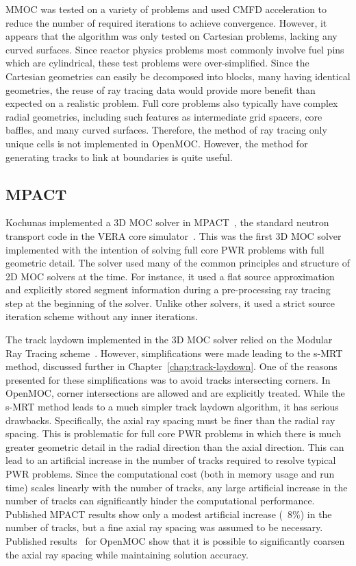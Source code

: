 MMOC was tested on a variety of problems and used \ac{CMFD} acceleration to reduce the number of required iterations to achieve convergence.  However, it appears that the algorithm was only tested on Cartesian problems, lacking any curved surfaces. Since reactor physics problems most commonly involve fuel pins which are cylindrical, these test problems were over-simplified. Since the Cartesian geometries can easily be decomposed into blocks, many having identical geometries, the reuse of ray tracing data would provide more benefit than expected on a realistic problem. Full core problems also typically have complex radial geometries, including such features as intermediate grid spacers, core baffles, and many curved surfaces. Therefore, the method of ray tracing only unique cells is not implemented in OpenMOC. However, the method for generating tracks to link at boundaries is quite useful.

\subsection{MPACT}
\label{sec:mpact}

Kochunas implemented a 3D \ac{MOC} solver in MPACT~\cite{mpact_initial, kochunas}, the standard neutron transport code in the VERA core simulator~\cite{vera}.  This was the first 3D \ac{MOC} solver implemented with the intention of solving full core PWR problems with full geometric detail. The solver used many of the common principles and structure of 2D \ac{MOC} solvers at the time. For instance, it used a flat source approximation and explicitly stored segment information during a pre-processing ray tracing step at the beginning of the solver. Unlike other solvers, it used a strict source iteration scheme without any inner iterations. 

The track laydown implemented in the 3D \ac{MOC} solver relied on the Modular Ray Tracing scheme~\cite{liu_mrt}. However, simplifications were made leading to the s-MRT method, discussed further in Chapter~\ref{chap:track-laydown}. One of the reasons presented for these simplifications was to avoid tracks intersecting corners. In OpenMOC, corner intersections are allowed and are explicitly treated. While the s-MRT method leads to a much simpler track laydown algorithm, it has serious drawbacks. Specifically, the axial ray spacing must be finer than the radial ray spacing. This is problematic for full core \ac{PWR} problems in which there is much greater geometric detail in the radial direction than the axial direction. This can lead to an artificial increase in the number of tracks required to resolve typical \ac{PWR} problems. Since the computational cost (both in memory usage and run time) scales linearly with the number of tracks, any large artificial increase in the number of tracks can significantly hinder the computational performance. Published MPACT results show only a modest artificial increase (~8\%) in the number of tracks, but a fine axial ray spacing was assumed to be necessary. Published results~\cite{shaner-laydown, openmoc-beavrs} for OpenMOC show that it is possible to significantly coarsen the axial ray spacing while maintaining solution accuracy.

